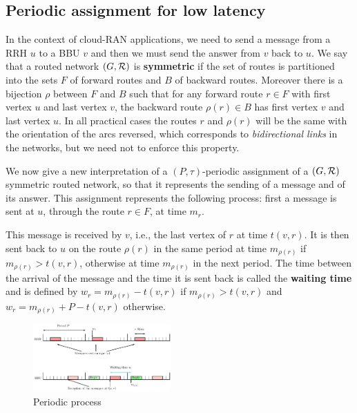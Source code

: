 \documentclass[10pt, conference, letterpaper]{IEEEtran}
\begin{document}
      
      \subsection{Periodic assignment for low latency}
      In the context of cloud-RAN applications, we need to send a message from a RRH $u$ to a BBU $v$ and then 
      we must send the answer from $v$ back to $u$. We say that a routed network $(G, {\cal R})$ is \textbf{symmetric} if the set of routes is partitioned into the sets $F$ of forward routes and $B$ of backward routes. Moreover there is a bijection $\rho$ between $F$ and $B$ such that for any forward route $r \in F$ with first vertex $u$ and last vertex $v$, the backward route $\rho(r) \in B$ has first vertex $v$ and last vertex $u$. In all practical cases the routes $r$ and $\rho(r)$ will be the same with the orientation of the arcs reversed, which corresponds to \emph{bidirectional links} in the networks, but we need not to enforce this property.
         
         We now give a new interpretation of a $(P,\tau)$-periodic assignment of a $(G,{\cal R})$ symmetric routed network, so that it represents the sending of a message and of its answer.
	This assignment represents the following process: first a message is sent at $u$, through the route $r \in F$, at time $m_r$.
       
  

      This message is received by $v$, i.e., the last vertex of $r$ at time $t(v,r)$. It is then sent back to $u$ on the route $\rho(r)$ in the same period at time $m_{\rho(r)}$ if $m_{\rho(r)} > t(v,r)$, otherwise at time $m_{\rho(r)}$ in the next period. The time between the arrival of the message and the time it is sent back is called the \textbf{waiting time} and is defined by $w_r = m_{\rho(r)} - t(v,r)$ if $m_{\rho(r)} > t(v,r)$ and $w_r = m_{\rho(r)} + P - t(v,r)$ otherwise.
 
     \begin{figure}
      \begin{center}
      \includegraphics[width=0.47\textwidth]{rrh.pdf}
      \end{center}
      \caption{Periodic process}
      \end{figure}
      
\end{document}
